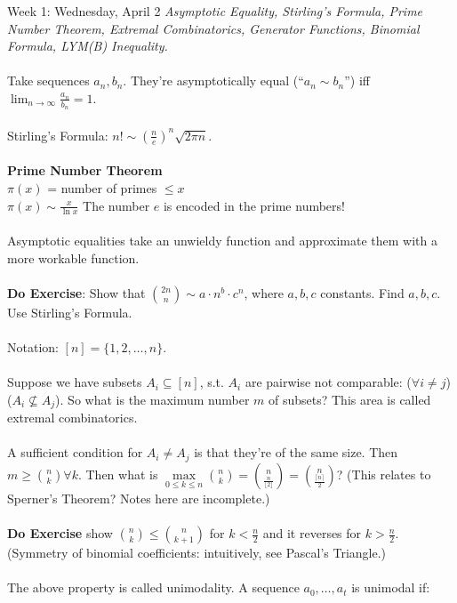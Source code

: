 \documentclass[12pt]{article}
\theoremstyle{remark}
\begin{document}
\label{2}\begin{section}{Week 1: Wednesday, April 2}
\indent\textit{Asymptotic Equality, Stirling's Formula, Prime Number Theorem, Extremal Combinatorics, Generator Functions, Binomial Formula, LYM(B) Inequality.}
\\\\
Take sequences $a_n, b_n$.
They're asymptotically equal (``$a_n \sim b_n$'') 
iff $\lim_{n\to\infty} \frac{a_n}{b_n} = 1$.
\\\\Stirling's Formula: $n! \sim (\frac{n}{e})^n \sqrt{2\pi n}$.
\\\\\textbf{Prime Number Theorem}
\\$\pi(x)$ = number of primes $\leq x$
\\$\pi(x) \sim \frac{x}{\ln x}$ The number $e$ is encoded in the prime numbers!
\\\\Asymptotic equalities take an unwieldy function and approximate them with a more workable function.\\
\\\textbf{Do Exercise}: Show that ${2n \choose n} \sim a \cdot n^b \cdot c^n$, where $a,b,c$ constants. Find $a,b,c$. Use Stirling's Formula.
\\\\Notation: $[n] = \{1,2,\ldots,n\}$.
\\\\Suppose we have subsets $A_i \subseteq [n]$, s.t. $A_i$ are pairwise not comparable: ($\forall i \neq j$)($A_i \nsubseteq A_j$). So what is the maximum number $m$ of subsets? This area is called extremal combinatorics. 
\\\\A sufficient condition for $A_i \neq A_j$ is that they're of the same size. Then $m \geq {n \choose k} \forall k$. 
Then what is $\max\limits_{0 \leq k \leq n} {n \choose k} = {n \choose \frac{n}{\lfloor 2 \rfloor}} = {n \choose \frac{\lceil n \rceil}{2}}$? (This relates to Sperner's Theorem? Notes here are incomplete.)
\\\\\textbf{Do Exercise} show ${n \choose k} \leq {n \choose k+1}$ for $k<\frac{n} {2}$ and it reverses for $k>\frac{n}{2}$. (Symmetry of binomial coefficients: intuitively, see Pascal's Triangle.) 
\\\\The above property is called unimodality. A sequence $a_0, \ldots, a_t$ is unimodal if: 

\end{section}
\end{document}
